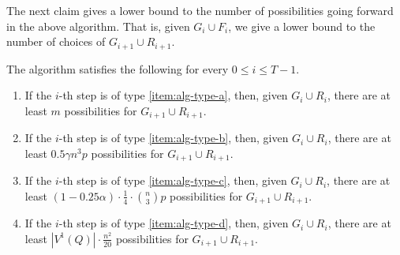 \documentclass[11pt,a4paper,oneside,reqno]{amsart}
\newcommand{\1}{\mathbbm{1}} %
\renewcommand{\le}{\leqslant}
\begin{document}
The next claim gives a lower bound to the number of possibilities going forward in the above algorithm. That is, given $G_i \cup F_i$, we give a lower bound to the number of choices of $G_{i+1} \cup R_{i+1}$.

\begin{claim}\label{claim:algorithm-bounds-forwards}
    The algorithm satisfies the following for every $0 \le i \le T-1$.
    \begin{enumerate}
        \item If the $i$-th step is of type \ref{item:alg-type-a}, then, given $G_i \cup R_i$, there are at least $m$ possibilities for $G_{i+1} \cup R_{i+1}$.

        \item If the $i$-th step is of type \ref{item:alg-type-b}, then, given $G_i \cup R_i$, there are at least $0.5\gamma n^3 p$ possibilities for $G_{i+1} \cup R_{i+1}$.

        \item If the $i$-th step is of type \ref{item:alg-type-c}, then, given $G_i \cup R_i$, there are at least $(1-0.25\alpha) \cdot \frac{1}{4} \cdot \binom{n}{3}p$ possibilities for $G_{i+1} \cup R_{i+1}$.

        \item If the $i$-th step is of type \ref{item:alg-type-d}, then, given $G_i \cup R_i$, there are at least $|V^1(Q)| \cdot \frac{n^2}{20}$ possibilities for $G_{i+1} \cup R_{i+1}$.
    \end{enumerate}
\end{claim}
\end{document}
